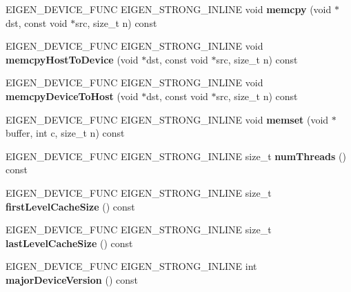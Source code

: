 \begin{DoxyCompactItemize}
\item 
\mbox{\label{struct_eigen_1_1_default_device_a61984e9d6b70218273aea25952877bef}} 
E\+I\+G\+E\+N\+\_\+\+D\+E\+V\+I\+C\+E\+\_\+\+F\+U\+NC E\+I\+G\+E\+N\+\_\+\+S\+T\+R\+O\+N\+G\+\_\+\+I\+N\+L\+I\+NE void {\bfseries memcpy} (void $\ast$dst, const void $\ast$src, size\+\_\+t n) const
\item 
\mbox{\label{struct_eigen_1_1_default_device_a978f0e67b69d1142d28c7c314c71ea9d}} 
E\+I\+G\+E\+N\+\_\+\+D\+E\+V\+I\+C\+E\+\_\+\+F\+U\+NC E\+I\+G\+E\+N\+\_\+\+S\+T\+R\+O\+N\+G\+\_\+\+I\+N\+L\+I\+NE void {\bfseries memcpy\+Host\+To\+Device} (void $\ast$dst, const void $\ast$src, size\+\_\+t n) const
\item 
\mbox{\label{struct_eigen_1_1_default_device_a4be26c1b7f78e27670975bafdfc75e68}} 
E\+I\+G\+E\+N\+\_\+\+D\+E\+V\+I\+C\+E\+\_\+\+F\+U\+NC E\+I\+G\+E\+N\+\_\+\+S\+T\+R\+O\+N\+G\+\_\+\+I\+N\+L\+I\+NE void {\bfseries memcpy\+Device\+To\+Host} (void $\ast$dst, const void $\ast$src, size\+\_\+t n) const
\item 
\mbox{\label{struct_eigen_1_1_default_device_a2a16cec4646fdc58b2f92ed552fb391d}} 
E\+I\+G\+E\+N\+\_\+\+D\+E\+V\+I\+C\+E\+\_\+\+F\+U\+NC E\+I\+G\+E\+N\+\_\+\+S\+T\+R\+O\+N\+G\+\_\+\+I\+N\+L\+I\+NE void {\bfseries memset} (void $\ast$buffer, int c, size\+\_\+t n) const
\item 
\mbox{\label{struct_eigen_1_1_default_device_a7c73e4e69f8c0ad6505104f45832a0d6}} 
E\+I\+G\+E\+N\+\_\+\+D\+E\+V\+I\+C\+E\+\_\+\+F\+U\+NC E\+I\+G\+E\+N\+\_\+\+S\+T\+R\+O\+N\+G\+\_\+\+I\+N\+L\+I\+NE size\+\_\+t {\bfseries num\+Threads} () const
\item 
\mbox{\label{struct_eigen_1_1_default_device_a7433e4c7d515d523cd81e2e93402152c}} 
E\+I\+G\+E\+N\+\_\+\+D\+E\+V\+I\+C\+E\+\_\+\+F\+U\+NC E\+I\+G\+E\+N\+\_\+\+S\+T\+R\+O\+N\+G\+\_\+\+I\+N\+L\+I\+NE size\+\_\+t {\bfseries first\+Level\+Cache\+Size} () const
\item 
\mbox{\label{struct_eigen_1_1_default_device_aa34a7449cafbe5ea56dba58f0e594410}} 
E\+I\+G\+E\+N\+\_\+\+D\+E\+V\+I\+C\+E\+\_\+\+F\+U\+NC E\+I\+G\+E\+N\+\_\+\+S\+T\+R\+O\+N\+G\+\_\+\+I\+N\+L\+I\+NE size\+\_\+t {\bfseries last\+Level\+Cache\+Size} () const
\item 
\mbox{\label{struct_eigen_1_1_default_device_a7396ca9b92e286981441b14056cf06a2}} 
E\+I\+G\+E\+N\+\_\+\+D\+E\+V\+I\+C\+E\+\_\+\+F\+U\+NC E\+I\+G\+E\+N\+\_\+\+S\+T\+R\+O\+N\+G\+\_\+\+I\+N\+L\+I\+NE int {\bfseries major\+Device\+Version} () const
\end{DoxyCompactItemize}


